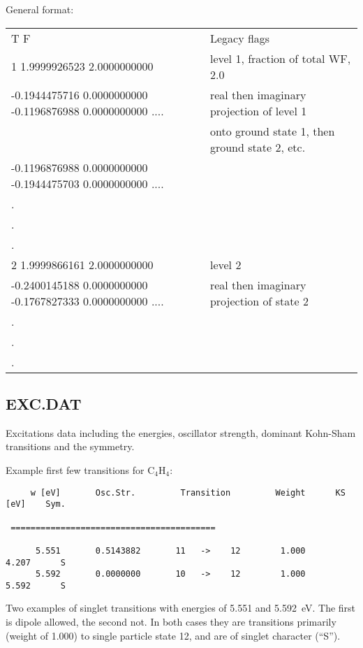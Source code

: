 General format:

\begin{tabular}{|l|p{5.5cm}|}
\hline
{\small T F                                }&Legacy flags\\
{\small   1  1.9999926523  2.0000000000    }&level 1, fraction of total WF, 2.0\\
{\small-0.1944475716  0.0000000000 -0.1196876988  0.0000000000 ....    }&real then
imaginary projection of level 1\\
                                    &onto ground state 1, then ground state 2, etc.\\
{\small-0.1196876988  0.0000000000 -0.1944475703  0.0000000000 ....    }&\\
{\small.}&\\
{\small.}&\\
{\small.}&\\
{\small   2  1.9999866161  2.0000000000    }&level 2\\
{\small-0.2400145188  0.0000000000 -0.1767827333  0.0000000000 ....}& real then
imaginary projection of state 2\\
{\small.}&\\
{\small.}&\\
{\small.}&\\ \hline
\end{tabular}

\subsection{EXC.DAT}

Excitations data including the energies, oscillator strength, dominant Kohn-Sham
transitions and the symmetry.

Example first few transitions for C$_4$H$_4$:

\begin{verbatim}
     w [eV]       Osc.Str.         Transition         Weight      KS [eV]    Sym.

 =========================================

      5.551       0.5143882       11   ->    12        1.000       4.207      S
      5.592       0.0000000       10   ->    12        1.000       5.592      S
\end{verbatim}

Two examples of singlet transitions with energies of 5.551 and 5.592~eV. The
first is dipole allowed, the second not. In both cases they are transitions
primarily (weight of 1.000) to single particle state 12, and are of singlet
character (``S'').

